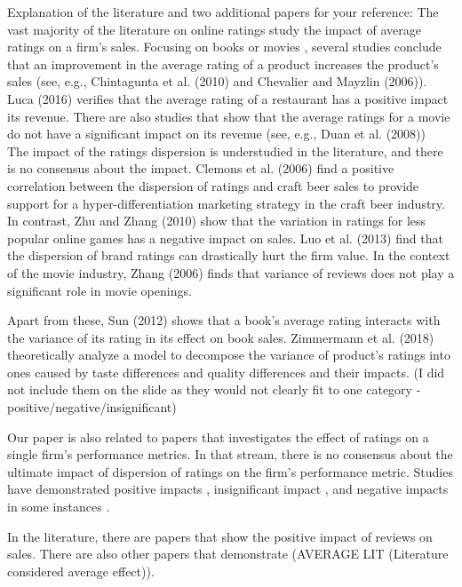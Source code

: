 \documentclass[msom,blindrev]{informs3}
\begin{document}
Explanation of the literature and two additional papers for your reference:
The vast majority of the literature on online ratings study the impact of average ratings on a firm’s sales. Focusing on books or movies , several studies conclude that an improvement in the average rating of a product increases the product’s sales (see, e.g., Chintagunta et al. (2010) and Chevalier and Mayzlin (2006)). Luca (2016) verifies that the average rating of a restaurant has a positive impact its revenue.  There are also studies that show that the average ratings for a movie do not have a significant impact on its revenue (see, e.g., Duan et al. (2008))
 
The impact of the ratings dispersion is understudied in the literature, and there is no consensus about the impact. Clemons et al. (2006) find a positive correlation between the dispersion of ratings and craft beer sales to provide support for a hyper-differentiation marketing strategy in the craft beer industry. In contrast, Zhu and Zhang (2010) show that the variation in ratings for less popular online games has a negative impact on sales.  Luo et al. (2013) find that the dispersion of brand ratings can drastically hurt the firm value. In the context of the movie industry, Zhang (2006) finds that variance of reviews does not play a significant role in movie openings.

Apart from these, Sun (2012) shows that a book’s average rating interacts with the variance of its rating in its effect on book sales. Zimmermann et al. (2018) theoretically analyze a model to decompose the variance of product’s ratings into ones caused by taste differences and quality differences and their impacts. (I did not include them on the slide as they would not clearly fit to one category - positive/negative/insignificant)







Our paper is also related to papers that investigates the effect of ratings on a single firm's performance metrics. In that stream, there is no consensus about the ultimate impact of dispersion of ratings on the firm's performance metric. Studies have demonstrated positive impacts \citep{chintagunta2010effects,chevalier2006effect,dellarocas2007exploring}, insignificant impact \citep{duan2008online}, and negative impacts in some instances \citep{wang2015user}.

In the literature, there are papers that show the positive impact of reviews on sales. There are also other papers that demonstrate  (AVERAGE LIT (Literature considered average effect)).\\
\end{document}
